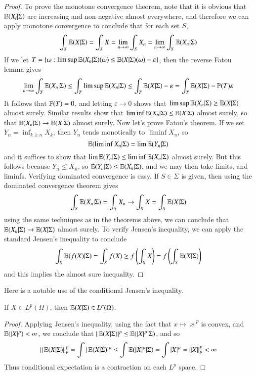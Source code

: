 \begin{proof}
    To prove the monotone convergence theorem, note that it is obvious that $\operatorname{\mathbb{E}}(X_i|\Sigma)$ are increasing and non-negative almost everywhere, and therefore we can apply monotone convergence to conclude that for each set $S$,
%
\[ \int_S \operatorname{\mathbb{E}}(X|\Sigma) = \int_S X = \lim_{n \to \infty} \int_S X_n = \lim_{n \to \infty} \int_S \operatorname{\mathbb{E}}(X_n|\Sigma) \]
%
If we let $T = \{ \omega : \limsup \operatorname{\mathbb{E}}(X_n|\Sigma)(\omega) \leq \operatorname{\mathbb{E}}(X|\Sigma)(\omega) - \varepsilon \}$, then the reverse Fatou lemma gives
%
\[ \lim_{n \to \infty} \int_T \operatorname{\mathbb{E}}(X_n|\Sigma) \leq \int_T \limsup \operatorname{\mathbb{E}}(X_n|\Sigma) \leq \int_T \operatorname{\mathbb{E}}(X|\Sigma) - \varepsilon = \int_T \operatorname{\mathbb{E}}(X|\Sigma) - \operatorname{\mathbb{P}}(T) \varepsilon \]
%
It follows that $\operatorname{\mathbb{P}}(T) = 0$, and letting $\varepsilon \to 0$ shows that $\limsup \operatorname{\mathbb{E}}(X_n|\Sigma) \geq \operatorname{\mathbb{E}}(X|\Sigma)$ almost surely. Similar results show that $\liminf \operatorname{\mathbb{E}}(X_n|\Sigma) \leq \operatorname{\mathbb{E}}(X|\Sigma)$ almost surely, so that $\operatorname{\mathbb{E}}(X_n|\Sigma) \to \operatorname{\mathbb{E}}(X|\Sigma)$ almost surely. Now let's prove Fatou's theorem. If we set $Y_n = \inf_{k \geq n} X_k$, then $Y_n$ tends monotically to $\liminf X_n$, so
%
\[ \operatorname{\mathbb{E}}(\liminf X_n|\Sigma) = \lim \operatorname{\mathbb{E}}(Y_n|\Sigma) \]
%
and it suffices to show that $\lim \operatorname{\mathbb{E}}(Y_n|\Sigma) \leq \liminf \operatorname{\mathbb{E}}(X_n|\Sigma)$ almost surely. But this follows because $Y_n \leq X_n$, so $\operatorname{\mathbb{E}}(Y_n|\Sigma) \leq \operatorname{\mathbb{E}}(X_n|\Sigma)$, and we may then take limits, and liminfs. Verifying dominated convergence is easy. If $S \in \Sigma$ is given, then using the dominated convergence theorem gives
%
\[ \int_S \operatorname{\mathbb{E}}(X_n|\Sigma) = \int_S X_n \to \int_S X = \int_S \operatorname{\mathbb{E}}(X|\Sigma) \]
%
using the same techniques as in the theorems above, we can conclude that $\operatorname{\mathbb{E}}(X_n|\Sigma) \to \operatorname{\mathbb{E}}(X|\Sigma)$ almost surely. To verify Jensen's inequality, we can apply the standard Jensen's inequality to conclude
%
\[ \int_S \operatorname{\mathbb{E}}(f(X)|\Sigma) = \int_S f(X) \geq f \left(\int_S X \right) = f \left( \int_S \operatorname{\mathbb{E}}(X|\Sigma) \right) \]
%
and this implies the almost sure inequality.
\end{proof}

Here is a notable use of the conditional Jensen's inequality.

\begin{prop}
    If $X \in L^p(\Omega)$, then $\operatorname{\mathbb{E}}(X|\Sigma) \in L^p(\Omega)$.
\end{prop}
\begin{proof}
    Applying Jensen's inequality, using the fact that $x \mapsto |x|^p$ is convex, and $\operatorname{\mathbb{E}}(|X|^p) < \infty$, we conclude that $|\operatorname{\mathbb{E}}(X|\Sigma)|^p \leq \operatorname{\mathbb{E}}(|X|^p|\Sigma)$, and so
    \[ \| \operatorname{\mathbb{E}}(X|\Sigma) \|_p^p = \int |\operatorname{\mathbb{E}}(X|\Sigma)|^p \leq \int \operatorname{\mathbb{E}}(|X|^p|\Sigma) = \int |X|^p = \| X \|_p^p < \infty \]
    Thus conditional expectation is a contraction on each $L^p$ space.
\end{proof}


